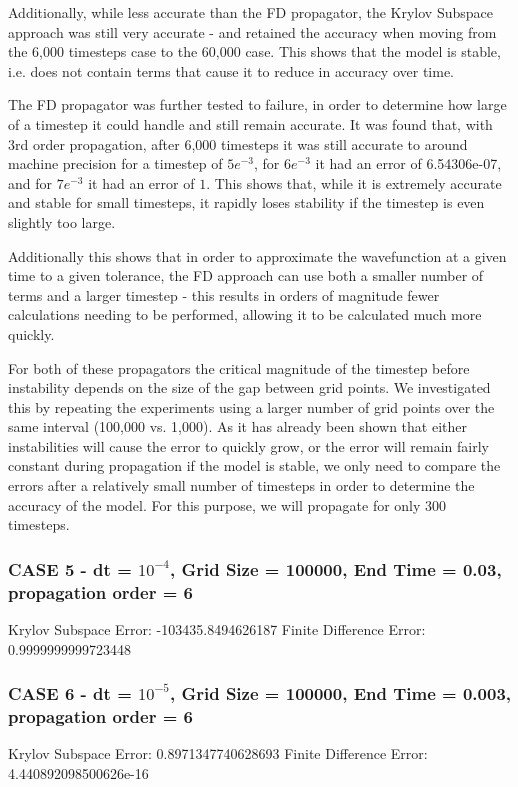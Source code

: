 Additionally, while less accurate than the FD propagator, the Krylov Subspace approach was still very accurate - and retained the accuracy when moving from the 6,000 timesteps case to the 60,000 case. This shows that the model is stable, i.e. does not contain terms that cause it to reduce in accuracy over time.

The FD propagator was further tested to failure, in order to determine how large of a timestep it could handle and still remain accurate. It was found that, with 3rd order propagation, after 6,000 timesteps it was still accurate to around machine precision for a timestep of $5e^{-3}$, for $6e^{-3}$ it had an error of 6.54306e-07, and for $7e^{-3}$ it had an error of $1$. This shows that, while it is extremely accurate and stable for small timesteps, it rapidly loses stability if the timestep is even slightly too large.

Additionally this shows that in order to approximate the wavefunction at a given time to a given tolerance, the FD approach can use both a smaller number of terms and a larger timestep - this results in orders of magnitude fewer calculations needing to be performed, allowing it to be calculated much more quickly.


For both of these propagators the critical magnitude of the timestep before instability depends on the size of the gap between grid points. We investigated this by repeating the experiments using a larger number of grid points over the same interval (100,000 vs. 1,000). As it has already been shown that either instabilities will cause the error to quickly grow, or the error will remain fairly constant during propagation if the model is stable, we only need to compare the errors after a relatively small number of timesteps in order to determine the accuracy of the model. For this purpose, we will propagate for only 300 timesteps.

\subsubsection{CASE 5 - dt = $10^{-4}$, Grid Size = 100000, End Time = 0.03, propagation order = 6}
Krylov Subspace Error: -103435.8494626187\newline
Finite Difference Error: 0.9999999999723448 

\subsubsection{CASE 6 - dt = $10^{-5}$, Grid Size = 100000, End Time = 0.003, propagation order = 6}
Krylov Subspace Error: 0.8971347740628693\newline
Finite Difference Error: 4.440892098500626e-16

